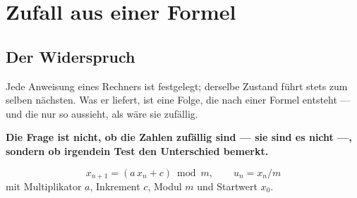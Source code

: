 \chapter{Zufall aus einer Formel}

\section{Der Widerspruch}

\begin{merksatz}
Jede Anweisung eines Rechners ist festgelegt; derselbe Zustand führt stets zum selben nächsten. Was er liefert, ist eine Folge, die nach einer Formel entsteht --- und die nur so aussieht, als wäre sie zufällig.

\begin{center}
\begin{minipage}{0.9\textwidth}
\textbf{Die Frage ist nicht, ob die Zahlen zufällig sind --- sie sind es nicht ---, sondern ob irgendein Test den Unterschied bemerkt.}
\end{minipage}
\end{center}

\begin{center}
\begin{minipage}{0.88\textwidth}
\end{minipage}
\end{center}
\end{merksatz}

\begin{definition}
\[ x_{n+1} = (a\,x_n + c) \bmod m, \qquad u_n = x_n/m \]
mit Multiplikator $a$, Inkrement $c$, Modul $m$ und Startwert $x_0$.
\end{definition}


